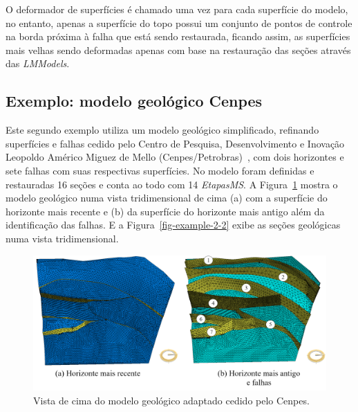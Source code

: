 O deformador de superfícies é chamado uma vez para cada superfície do modelo, no entanto, apenas a superfície do topo possui um conjunto de pontos de controle na borda próxima à falha que está sendo restaurada, ficando assim, as superfícies mais velhas sendo deformadas apenas com base na restauração das seções através das \textit{LMModels}.

\subsection{Exemplo: modelo geológico Cenpes}\label{ex-2-surf}

Este segundo exemplo utiliza um modelo geológico simplificado, refinando superfícies e falhas cedido pelo Centro de Pesquisa, Desenvolvimento e Inovação Leopoldo Américo Miguez de Mello (Cenpes/Petrobras)~\cite{Cenpes}, com dois horizontes e sete falhas com suas respectivas superfícies. No modelo foram definidas e restauradas 16 seções e conta ao todo com 14 \textit{EtapasMS}. A Figura~\ref{fig-example-2-1} mostra o modelo geológico numa vista tridimensional de cima (a) com a superfície do horizonte mais recente e (b) da superfície do horizonte mais antigo além da identificação das falhas. E a Figura~\ref{fig-example-2-2} exibe as seções geológicas numa vista tridimensional.

\begin{figure} [H]
  \begin{center}
    \includegraphics[width=\textwidth]{images/fig-example-2-1}
    \caption{Vista de cima do modelo geológico adaptado cedido pelo Cenpes.}\label{fig-example-2-1}
  \end{center}
\end{figure}



